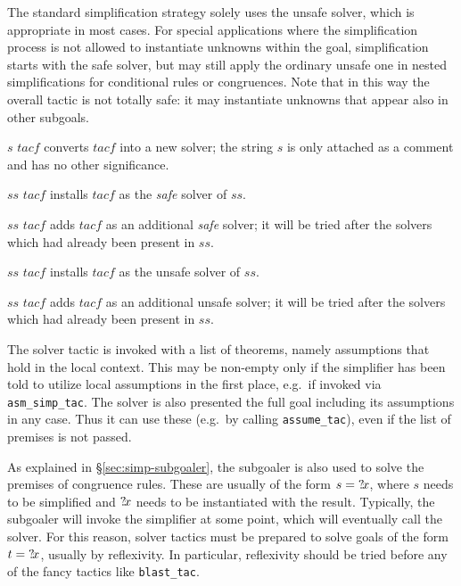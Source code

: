 The standard simplification strategy solely uses the unsafe solver,
which is appropriate in most cases.  For special applications where
the simplification process is not allowed to instantiate unknowns
within the goal, simplification starts with the safe solver, but may
still apply the ordinary unsafe one in nested simplifications for
conditional rules or congruences. Note that in this way the overall
tactic is not totally safe:  it may instantiate unknowns that appear also 
in other subgoals.

\begin{ttdescription}
\item[\ttindexbold{mk_solver} $s$ $tacf$] converts $tacf$ into a new solver;
  the string $s$ is only attached as a comment and has no other significance.

\item[$ss$ \ttindexbold{setSSolver} $tacf$] installs $tacf$ as the
  \emph{safe} solver of $ss$.
  
\item[$ss$ \ttindexbold{addSSolver} $tacf$] adds $tacf$ as an
  additional \emph{safe} solver; it will be tried after the solvers
  which had already been present in $ss$.
  
\item[$ss$ \ttindexbold{setSolver} $tacf$] installs $tacf$ as the
  unsafe solver of $ss$.
  
\item[$ss$ \ttindexbold{addSolver} $tacf$] adds $tacf$ as an
  additional unsafe solver; it will be tried after the solvers which
  had already been present in $ss$.

\end{ttdescription}

\medskip

 The solver tactic is invoked
with a list of theorems, namely assumptions that hold in the local
context.  This may be non-empty only if the simplifier has been told
to utilize local assumptions in the first place, e.g.\ if invoked via
\texttt{asm_simp_tac}.  The solver is also presented the full goal
including its assumptions in any case.  Thus it can use these (e.g.\ 
by calling \texttt{assume_tac}), even if the list of premises is not
passed.

\medskip

As explained in {\S}\ref{sec:simp-subgoaler}, the subgoaler is also used
to solve the premises of congruence rules.  These are usually of the
form $s = {?\!x}$, where $s$ needs to be simplified and ${?\!x}$
needs to be instantiated with the result.  Typically, the subgoaler
will invoke the simplifier at some point, which will eventually call
the solver.  For this reason, solver tactics must be prepared to solve
goals of the form $t = {?\!x}$, usually by reflexivity.  In
particular, reflexivity should be tried before any of the fancy
tactics like \texttt{blast_tac}.

